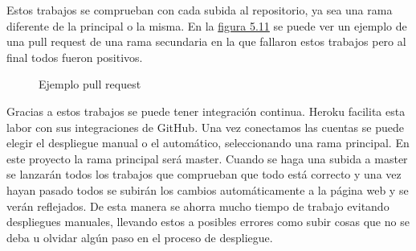 Estos trabajos se comprueban con cada subida al repositorio, ya sea una rama
diferente de la principal o la misma. En la \hyperref[fig:Ejemplo pull request]{figura 5.11}
se puede ver un ejemplo de una pull request de una rama secundaria en la que
fallaron estos trabajos pero al final todos fueron positivos.

\begin{figure}[htb]
  \centering
  \scalebox{.8}{\texttt{[image: CI]}}
  \caption[Ejemplo pull request]{Ejemplo pull request}
  \label{fig:Ejemplo pull request}
\end{figure}

Gracias a estos trabajos se puede tener integración continua. Heroku facilita
esta labor con sus integraciones de GitHub. Una vez conectamos las cuentas se
puede elegir el despliegue manual o el automático, seleccionando una rama principal.
En este proyecto la rama principal será master. Cuando se haga una subida a master
se lanzarán todos los trabajos que comprueban que todo está correcto y una vez hayan
pasado todos se subirán los cambios automáticamente a la página web y se verán reflejados.
De esta manera se ahorra mucho tiempo de trabajo evitando despliegues manuales, llevando estos
a posibles errores como subir cosas que no se deba u olvidar algún paso en el proceso
de despliegue.
